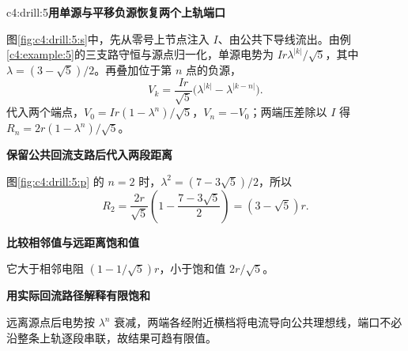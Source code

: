 \begin{drillsolution}{c4:drill:5}\textbf{用单源与平移负源恢复两个上轨端口}\par\nobreak
图\ref{fig:c4:drill:5:s}中，先从零号上节点注入 $I$、由公共下导线流出。由例\ref{c4:example:5}的三支路守恒与源点归一化，单源电势为 $Ir\lambda^{|k|}/\sqrt5$，其中 $\lambda=(3-\sqrt5)/2$。再叠加位于第 $n$ 点的负源，
\[
 V_k=\frac{Ir}{\sqrt5}\bigl(\lambda^{|k|}-\lambda^{|k-n|}\bigr).
\]
代入两个端点，$V_0=Ir(1-\lambda^n)/\sqrt5$，$V_n=-V_0$；两端压差除以 $I$ 得 $R_n=2r(1-\lambda^n)/\sqrt5$。



\par\medskip{}\noindent\textbf{保留公共回流支路后代入两段距离}\par\nobreak
图\ref{fig:c4:drill:5:p} 的 $n=2$ 时，$\lambda^2=(7-3\sqrt5)/2$，所以
\[
 R_2=\frac{2r}{\sqrt5}\left(1-\frac{7-3\sqrt5}{2}\right)
 =(3-\sqrt5)r.
\]


\par\medskip{}\noindent\textbf{比较相邻值与远距离饱和值}\par\nobreak
它大于相邻电阻 $(1-1/\sqrt5)r$，小于饱和值 $2r/\sqrt5$。

\par\medskip{}\noindent\textbf{用实际回流路径解释有限饱和}\par\nobreak
远离源点后电势按 $\lambda^n$ 衰减，两端各经附近横档将电流导向公共理想线，端口不必沿整条上轨逐段串联，故结果可趋有限值。\end{drillsolution}
